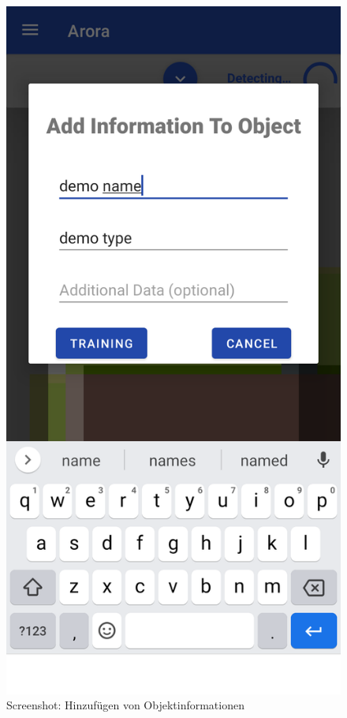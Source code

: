 \documentclass[oneside]{ausarbeitung}
\begin{document}
\begin{figure}[hptb]
	\centering
	\includegraphics[height=0.6\textheight]{images/screenshots/add-info.png}
	\caption{Screenshot: Hinzufügen von Objektinformationen}
	\label{fig:screenshot:add-info}
\end{figure}
\end{document}
